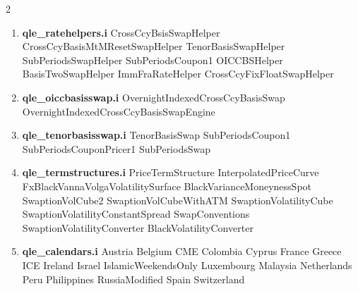 \documentclass[10pt]{article}
\begin{document}
\begin{multicols}{2}
\begin{enumerate}
                \subitem FxForward
                \subitem DiscountingFxForward
                \subitem Payment
                \subitem PaymentDiscountingEngine
                \subitem Deposit
                \subitem DepositEngine
                \subitem DiscountingSwapEngineMultiCurve
        \item \textbf{qle\_ratehelpers.i}
                \subitem CrossCcyBsisSwapHelper
                \subitem CrossCcyBasisMtMResetSwapHelper
                \subitem TenorBasisSwapHelper
                \subitem SubPeriodsSwapHelper
                \subitem SubPeriodsCoupon1
                \subitem OICCBSHelper
                \subitem BasisTwoSwapHelper
                \subitem ImmFraRateHelper
                \subitem CrossCcyFixFloatSwapHelper
        \item \textbf{qle\_oiccbasisswap.i}
                \subitem OvernightIndexedCrossCcyBasisSwap
                \subitem OvernightIndexedCrossCcyBasisSwapEngine
        \item \textbf{qle\_tenorbasisswap.i}
                \subitem TenorBasisSwap
                \subitem SubPeriodsCoupon1
                \subitem SubPeriodsCouponPricer1
                \subitem SubPeriodsSwap
        \item \textbf{qle\_termstructures.i}
                \subitem PriceTermStructure
                \subitem InterpolatedPriceCurve
                \subitem FxBlackVannaVolgaVolatilitySurface
                \subitem BlackVarianceMoneynessSpot
                \subitem SwaptionVolCube2
                \subitem SwaptionVolCubeWithATM
                \subitem SwaptionVolatilityCube
                \subitem SwaptionVolatilityConstantSpread
                \subitem SwapConventions
                \subitem SwaptionVolatilityConverter
                \subitem BlackVolatilityConverter
        \item \textbf{qle\_calendars.i}
                \subitem Austria
                \subitem Belgium
                \subitem CME
                \subitem Colombia
                \subitem Cyprus
                \subitem France
                \subitem Greece
                \subitem ICE
                \subitem Ireland
                \subitem Israel
                \subitem IslamicWeekendsOnly
                \subitem Luxembourg
                \subitem Malaysia
                \subitem Netherlands
                \subitem Peru
                \subitem Philippines
                \subitem RussiaModified
                \subitem Spain
                \subitem Switzerland

\end{enumerate}
\end{multicols}
\end{document}
